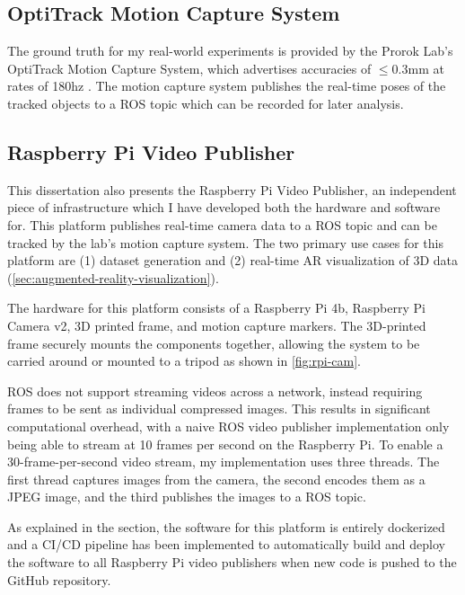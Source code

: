 \subsection{OptiTrack Motion Capture System}
\label{sec:optitrack-motion-capture-system}
The ground truth for my real-world experiments is provided by the Prorok Lab's OptiTrack Motion Capture System, which advertises accuracies of $\leq$0.3mm at rates of 180hz \autocite{OptiTrackForRobotics}. The motion capture system publishes the real-time poses of the tracked objects to a ROS topic which can be recorded for later analysis.

\subsection{Raspberry Pi Video Publisher}
\label{sec:raspberry-pi-video-publisher}
This dissertation also presents the Raspberry Pi Video Publisher, an independent piece of infrastructure which I have developed both the hardware and software for. This platform publishes real-time camera data to a ROS topic and can be tracked by the lab's motion capture system. The two primary use cases for this platform are (1) dataset generation and (2) real-time AR visualization of 3D data (\autoref{sec:augmented-reality-visualization}).

The hardware for this platform consists of a Raspberry Pi 4b, Raspberry Pi Camera v2, 3D printed frame, and motion capture markers. The 3D-printed frame securely mounts the components together, allowing the system to be carried around or mounted to a tripod as shown in \autoref{fig:rpi-cam}.

ROS does not support streaming videos across a network, instead requiring frames to be sent as individual compressed images. This results in significant computational overhead, with a naive ROS video publisher implementation only being able to stream at 10 frames per second on the Raspberry Pi. To enable a 30-frame-per-second video stream, my implementation uses three threads. The first thread captures images from the camera, the second encodes them as a JPEG image, and the third publishes the images to a ROS topic.

As explained in the  section, the software for this platform is entirely dockerized and a CI/CD pipeline has been implemented to automatically build and deploy the software to all Raspberry Pi video publishers when new code is pushed to the GitHub repository.


